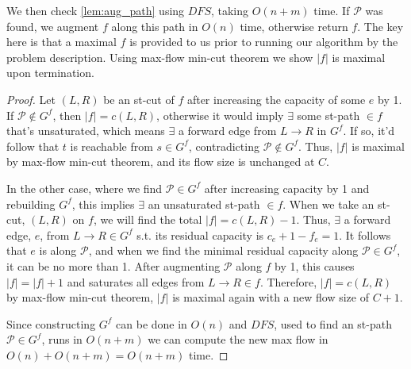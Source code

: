 \documentclass{article}
\begin{document}
	We then check \ref{lem:aug_path} using $DFS$, taking $O(n+m)$ time. If $\mathcal{P}$ was found, we augment $f$ along this path in $O(n)$ time, otherwise return $f$. The key here is that a maximal $f$ is provided to us prior to running our algorithm by the problem description. Using max-flow min-cut theorem we show $|f|$ is maximal upon termination.

\begin{proof}
	Let $(L,R)$ be an st-cut of $f$ after increasing the capacity of some $e$ by 1. If $\mathcal{P} \notin G^f$, then $|f| = c(L,R)$, otherwise it would imply $\exists$ some st-path $\in f$ that's unsaturated, which means $\exists$ a forward edge from $L \to R$ in $G^f$. If so, it'd follow that $t$ is reachable from $s \in G^f$, contradicting  $\mathcal{P} \notin G^f$. Thus, $|f|$ is maximal by max-flow min-cut theorem, and its flow size is unchanged at $C$.
	
	In the other case, where we find $\mathcal{P} \in G^f$ after increasing capacity by 1 and rebuilding $G^f$, this implies $\exists$ an unsaturated st-path $\in f$. When we take an st-cut, $(L,R)$ on $f$, we will find the total $|f| = c(L,R) -1$. Thus, $\exists$ a forward edge, $e$, from $L \to R \in G^f$ s.t. its residual capacity is $c_e +1- f_e = 1$. It follows that $e$ is along $\mathcal{P}$, and when we find the minimal residual capacity along $\mathcal{P} \in G^f$, it can be no more than 1. After augmenting $\mathcal{P}$ along $f$ by 1, this causes $|f| = |f|+1$ and saturates all edges from $L \to R \in f$. Therefore, $|f| = c(L,R)$ by max-flow min-cut theorem, $|f|$ is maximal again with a new flow size of $C+1$.
	
	Since constructing $G^f$ can be done in $O(n)$ and $DFS$, used to find an st-path $\mathcal{P} \in G^f$, runs in $O(n+m)$ we can compute the new max flow in $O(n) + O(n+m) = O(n+m)$ time.
\end{proof}
 
\end{document}
